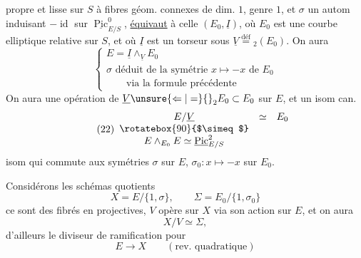 propre et lisse sur $S$ à fibres géom. connexes de dim. $1$, genre $1$, et $\sigma$ un autom induisant $-\operatorname{id}$ sur $\underline{\operatorname{Pic}}^0_{E/S}$, \uline{équivaut} à celle   $(E_0,\underline I)$, où $E_0$ est une courbe elliptique relative sur $S$, et où $\underline I$ est un torseur sous  $\underline V\overset{\mathrm{déf}}={}_2(E_0)$. On aura
\[
\tag{21}\left\{\begin{array}{l}
E=\underline I\wedge_{\underline V}E_0\\
\sigma\text{ déduit de la symétrie }x\mapsto-x\text{ de }E_0\\
\qquad\text{via la formule précédente}
\end{array}\right.
\]
On aura une opération de $\underline V\unsure{\Leftarrow|=}{}_2E_0\subset E_0$ sur $E$, et un isom can.
\[
\tag{22}\begin{array}{ccc}
E/\underline V&\simeq&E_0\\
\rotatebox{90}{$\simeq$}&&\\
E\wedge_{E_0}E\simeq\underline{\operatorname{Pic}}^2_{E/S}&&
\end{array}
\]
isom qui commute aux symétries $\sigma$ sur $E$, $\sigma_0:x\mapsto-x$ sur $E_0$.

Considérons les schémas quotients
\[
\tag{23}X=E/\{1,\sigma\},\qquad\Sigma=E_0/\{1,\sigma_0\}
\]
ce sont des fibrés en   projectives,
 $V$ opère  sur $X$  via son  action sur $E$, et on aura
\[
\tag{24}X/V\simeq\Sigma,
\]
d'ailleurs le diviseur de ramification pour
\[
\tag{25}E\longrightarrow X\qquad(\text{rev. quadratique})
\]

